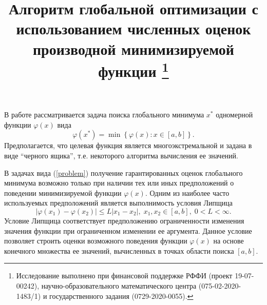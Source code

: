 \documentclass[11pt, oneside, a4paper]{article}
\begin{document}
\setcounter{page}{1}



\title{
Алгоритм глобальной оптимизации с использованием численных оценок производной минимизируемой функции
\footnote{Исследование выполнено при финансовой поддержке РФФИ (проект 19-07-00242), научно-образовательного математического центра (075-02-2020-1483/1) и государственного задания (0729-2020-0055).}
}





\bigskip

В работе рассматривается задача поиска глобального минимума $x^*$ одномерной функции $\varphi(x)$ вида
\begin{equation}\label{problem}
\varphi(x^*)=\min\left\{\varphi(x):x\in\left[a,b\right]\right\}.
\end{equation}
Предполагается, что целевая функция является многоэкстремальной и задана в виде ``черного ящика'', т.е. некоторого алгоритма вычисления ее значений. 

В задачах вида (\ref{problem}) получение гарантированных оценок глобального минимума возможно только при наличии тех или иных предположений о поведении минимизируемой функции $\varphi(x)$. Одним из наиболее часто используемых предположений является выполнимость условия Липщица
\[
\left|\varphi(x_1)-\varphi(x_2)\right|\leq L\left|x_1-x_2\right|,\; x_1,x_2 \in [a,b],\; 0<L<\infty.
\]
Условие Липщица соответствует предположению ограниченности изменения значения функции при ограниченном изменении ее аргумента. Данное условие позволяет строить оценки возможного поведения функции $\varphi(x)$ на основе конечного множества ее значений, вычисленных в точках области поиска $[a,b]$.
\end{document}
